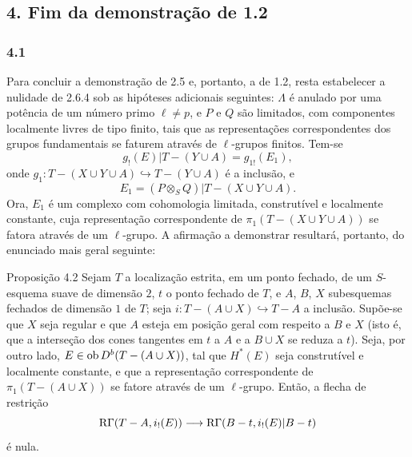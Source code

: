 \subsection*{4. Fim da demonstração de 1.2}

\subsubsection*{4.1}
Para concluir a demonstração de 2.5 e, portanto, a de 1.2, resta estabelecer a nulidade de 2.6.4 sob as hipóteses adicionais seguintes: $\Lambda$ é anulado por uma potência de um número primo $\ell\ne p$, e $P$ e $Q$ são limitados, com componentes localmente livres de tipo finito, tais que as representações correspondentes dos grupos fundamentais se faturem através de $\ell$-grupos finitos. Tem-se
\[
g_!(E)|T-(Y\cup A)=g_{1!}(E_1),
\]
onde $g_1:T-(X\cup Y\cup A)\hookrightarrow T-(Y\cup A)$ é a inclusão, e
\[
E_1=(P\otimes_S Q)|T-(X\cup Y\cup A).
\]
Ora, $E_1$ é um complexo com cohomologia limitada, construtível e localmente constante, cuja representação correspondente de $\pi_1(T-(X\cup Y\cup A))$ se fatora através de um $\ell$-grupo. A afirmação a demonstrar resultará, portanto, do enunciado mais geral seguinte:

\begin{statement}{Proposição 4.2}
Sejam $T$ a localização estrita, em um ponto fechado, de um $S$-esquema suave de dimensão $2$, $t$ o ponto fechado de $T$, e $A$, $B$, $X$ subesquemas fechados de dimensão $1$ de $T$; seja $i:T-(A\cup X)\hookrightarrow T-A$ a inclusão. Supõe-se que $X$ seja regular e que $A$ esteja em posição geral com respeito a $B$ e $X$ (isto é, que a interseção dos cones tangentes em $t$ a $A$ e a $B\cup X$ se reduza a $t$). Seja, por outro lado, $E\in\operatorname{ob} D^b(T-(A\cup X))$, tal que $H^*(E)$ seja construtível e localmente constante, e que a representação correspondente de $\pi_1(T-(A\cup X))$ se fatore através de um $\ell$-grupo. Então, a flecha de restrição
\[
\mathrm{R}\Gamma(T-A,i_!(E))
\longrightarrow
\mathrm{R}\Gamma(B-t,i_!(E)|B-t)
\]
é nula.
\end{statement}
